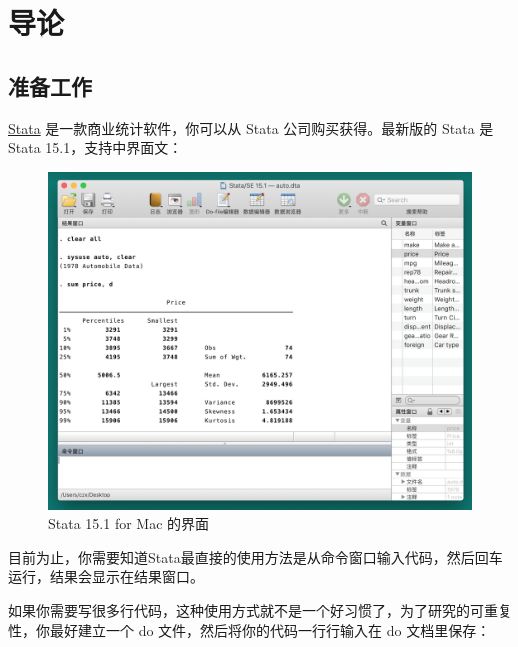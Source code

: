 \chapter{导论}

\section{准备工作}

\href{https://www.stata.com/}{Stata} 是一款商业统计软件，你可以从 Stata 公司购买获得。最新版的 Stata 是 Stata 15.1，支持中界面文：

\begin{figure}[htbp]
  \centering
  \includegraphics[width = \textwidth]{assets/stataui.png}
  \caption{Stata 15.1 for Mac 的界面}
  \label{fig:stataui}
\end{figure}

目前为止，你需要知道Stata最直接的使用方法是从命令窗口输入代码，然后回车运行，结果会显示在结果窗口。

如果你需要写很多行代码，这种使用方式就不是一个好习惯了，为了研究的可重复性，你最好建立一个 do 文件，然后将你的代码一行行输入在 do 文档里保存：

